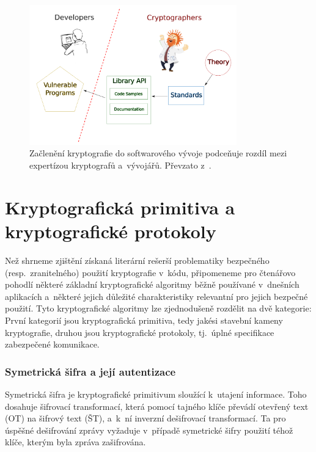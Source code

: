 \begin{figure}[!ht]
    \centering
    \label{img-devs-crypto}
    \includegraphics[width=0.8\textwidth]{text/media/developers_cryptographers.png}
    \caption[~Začlenění kryptografie do softwarového vývoje]{Začlenění kryptografie do softwarového vývoje podceňuje rozdíl mezi expertízou kryptografů a~vývojářů. Převzato z~\cite{das2014iv}.}
\end{figure}

\section{Kryptografická primitiva a kryptografické protokoly}

Než shrneme zjištění získaná literární rešerší problematiky bezpečného (resp.\ zranitelného) po\-u\-ži\-tí kryptografie v~kódu, při\-po\-me\-ne\-me pro čtenářovo pohodlí některé základní kryptografické algoritmy běžně používané v~dnešních aplikacích a~některé jejich důležité charakteristiky relevantní pro jejich bezpečné použití. Tyto kryptografické algoritmy lze zjednodušeně rozdělit na dvě kategorie: První kategorií jsou kryptografická primitiva, tedy jakési stavební kameny kryptografie, druhou jsou kryptografické protokoly, tj.~úplné specifikace zabezpečené komunikace.

\subsubsection*{Symetrická šifra a její autentizace}

Symetrická šifra je kryptografické primitivum sloužící k~utajení informace. Toho dosahuje šif\-ro\-va\-cí transformací, která pomocí tajného klíče převádí otevřený text (OT) na šifrový text (ŠT), a~k~ní inverzní de\-šif\-ro\-va\-cí transformací. Ta pro úspěšné dešifrování zprávy vyžaduje v~případě symetrické šifry použití téhož klíče, kterým byla zpráva zašifrována.

